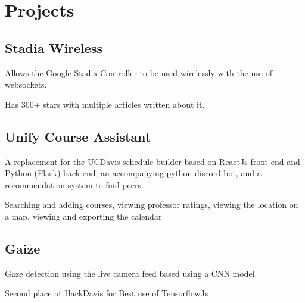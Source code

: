 \documentclass[]{deedy-resume-openfont}
\begin{document}
\begin{minipage}[t]{0.66\textwidth}
\section{Projects}

\subsection*{Stadia Wireless}
\vspace{\topsep}
\begin{tightemize}
\item Allows the Google Stadia Controller to be used wirelessly with the use of websockets.
\item Has 300+ stars with multiple articles written about it.
\end{tightemize}
\sectionsep

\subsection*{Unify Course Assistant}
\vspace{\topsep}
\begin{tightemize}
\item A replacement for the UCDavis schedule builder based on ReactJs front-end and Python (Flask) back-end, an accompanying python discord bot, and a recommendation system to find peers.
\item Searching and adding courses, viewing professor ratings, viewing the location on a map, viewing and exporting the calendar
\end{tightemize}
\sectionsep

\subsection*{Gaize}
\begin{tightemize}
\item Gaze detection using the live camera feed based using a CNN model.
\item Second place at HackDavis for Best use of TensorflowJs
\end{tightemize}
\sectionsep


\end{minipage}
\end{document}
